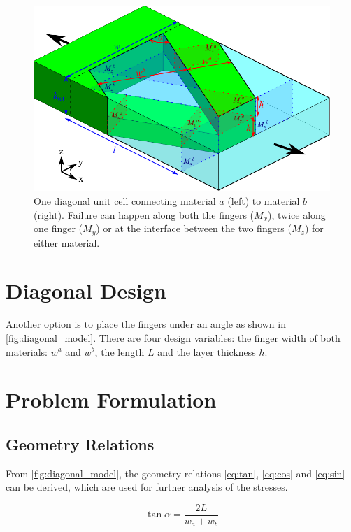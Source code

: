 
\begin{figure}[H]
	\centering
	\includegraphics[width=\columnwidth]{sources/method/diagonal_model_v3.pdf}
	\caption{
		One diagonal unit cell connecting material $a$ (left) to material $b$ (right).
		Failure can happen along both the fingers ($M_x$), twice along one finger ($M_y$) or at the interface between the two fingers ($M_z$) for either material.}
	\label{fig:diagonal_model}
\end{figure}



\section{Diagonal Design}

Another option is to place the fingers under an angle as shown in \autoref{fig:diagonal_model}.
There are four design variables: the finger width of both materials: $w^a$ and $w^b$, the length $L$ and the layer thickness $h$.

\section{Problem Formulation}
\subsection{Geometry Relations}
From \autoref{fig:diagonal_model}, the geometry relations \ref{eq:tan}, \ref{eq:cos} and \ref{eq:sin} can be derived, which are used for further analysis of the stresses.

\begin{equation}
	\label{eq:tan}
	\tan \alpha = \frac{2L}{w_a + w_b}
\end{equation}

